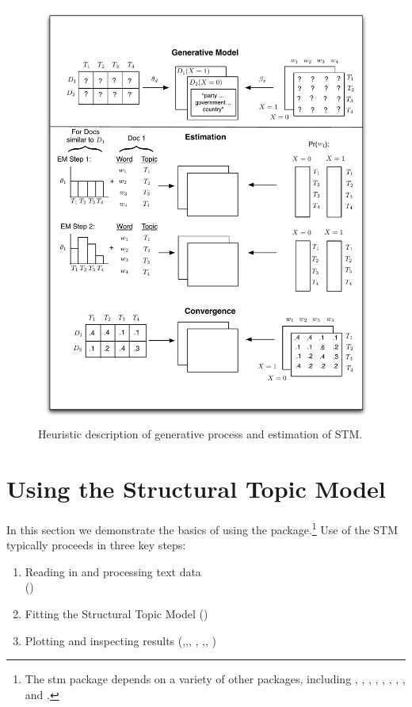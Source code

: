 \documentclass[nojss]{jss}
\begin{document}
\begin{figure}[h!]
  \centering
  \includegraphics[scale=.45]{STMdiagram.pdf}
  \caption{Heuristic description of generative process and estimation of STM.}\label{fig:stmoverview}
\end{figure}

\section{Using the Structural Topic Model}
\label{sec:use}

In this section we demonstrate the basics of using the package.\footnote{The stm package depends on a variety of other packages, including  \citep{MatrixStats},  \citep{slam},  \citep{lda},  \citep{stringr},  \citep{SnowballC},  \citep{meyer2008text},  \citep{igraph},  \citep{huge}, and  \citep{friedman2010regularization}.} Use of the STM typically proceeds in three key steps:

\begin{enumerate}
\item Reading in and processing text data \\
()
\item Fitting the Structural Topic Model
()
\item Plotting and inspecting results
(,,, , ,, )
\end{enumerate}
\end{document}
